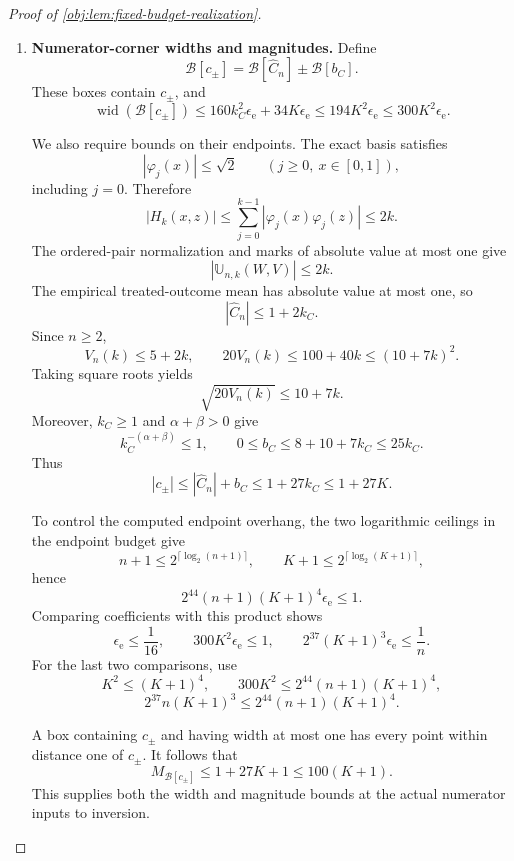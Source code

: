 \begin{proof}[Proof of \cref{obj:lem:fixed-budget-realization}]
\begin{enumerate}
\item \textbf{Numerator-corner widths and magnitudes.}
Define
\[
\mathcal B[c_\pm]
=\mathcal B[\widehat C_n]\pm\mathcal B[b_C].
\]
These boxes contain \(c_\pm\), and
\[
\operatorname{wid}(\mathcal B[c_\pm])
\le160k_C^2\epsilon_{\mathrm e}+34K\epsilon_{\mathrm e}
\le194K^2\epsilon_{\mathrm e}
\le300K^2\epsilon_{\mathrm e}.
\]

We also require bounds on their endpoints. The exact basis satisfies
\[
|\varphi_j(x)|\le\sqrt2
\qquad(j\ge0,\ x\in[0,1]),
\]
including \(j=0\). Therefore
\[
|H_k(x,z)|
\le\sum_{j=0}^{k-1}|\varphi_j(x)\varphi_j(z)|
\le2k.
\]
The ordered-pair normalization and marks of absolute value at most one give
\[
|\mathbb U_{n,k}(W,V)|\le2k.
\]
The empirical treated-outcome mean has absolute value at most one, so
\[
|\widehat C_n|\le1+2k_C.
\]
Since \(n\ge2\),
\[
V_n(k)\le5+2k,
\qquad
20V_n(k)\le100+40k\le(10+7k)^2.
\]
Taking square roots yields
\[
\sqrt{20V_n(k)}\le10+7k.
\]
Moreover, \(k_C\ge1\) and \(\alpha+\beta>0\) give
\[
k_C^{-(\alpha+\beta)}\le1,
\qquad
0\le b_C\le8+10+7k_C\le25k_C.
\]
Thus
\[
|c_\pm|
\le|\widehat C_n|+b_C
\le1+27k_C\le1+27K.
\]

To control the computed endpoint overhang, the two logarithmic ceilings in the endpoint budget give
\[
n+1\le2^{\lceil\log_2(n+1)\rceil},
\qquad
K+1\le2^{\lceil\log_2(K+1)\rceil},
\]
hence
\[
2^{44}(n+1)(K+1)^4\epsilon_{\mathrm e}\le1.
\]
Comparing coefficients with this product shows
\[
\epsilon_{\mathrm e}\le\frac1{16},
\qquad
300K^2\epsilon_{\mathrm e}\le1,
\qquad
2^{37}(K+1)^3\epsilon_{\mathrm e}\le\frac1n.
\]
For the last two comparisons, use
\[
K^2\le(K+1)^4,
\qquad
300K^2\le2^{44}(n+1)(K+1)^4,
\]
\[
2^{37}n(K+1)^3
\le2^{44}(n+1)(K+1)^4.
\]

A box containing \(c_\pm\) and having width at most one has every point within distance one of \(c_\pm\). It follows that
\[
M_{\mathcal B[c_\pm]}
\le1+27K+1\le100(K+1).
\]
This supplies both the width and magnitude bounds at the actual numerator inputs to inversion.


\end{enumerate}
\end{proof}
